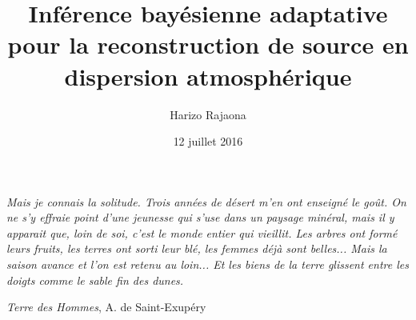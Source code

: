 \documentclass[oneside]{book}
\title{Inférence bayésienne adaptative pour la reconstruction de source en dispersion atmosphérique}
\date{12 juillet 2016}
\author{Harizo Rajaona}
\begin{document}
	\pagestyle{empty}
	
		\null
		\thispagestyle{empty}%
		\newpage

	\frontmatter
	\pagestyle{plain}

	
	\cleardoublepage

	
	\cleardoublepage

\setlength{\epigraphwidth}{0.8\textwidth}
\epigraph{\textit{\og Mais je connais la solitude. Trois années de désert m'en ont enseigné le goût. On ne s'y effraie point d'une jeunesse qui s'use dans un paysage minéral, mais il y apparait que, loin de soi, c'est le monde entier qui vieillit. Les arbres ont formé leurs fruits, les terres ont sorti leur blé, les femmes déjà sont belles... Mais la saison avance et l'on est retenu au loin... Et les biens de la terre glissent entre les doigts comme le sable fin des dunes. \fg{}}}{\textit{Terre des Hommes}, A. de Saint-Exupéry}
\cleardoublepage

	\renewcommand{\contentsname}{Sommaire} %
	\pagestyle{plain}
	\afterpage{\blankpage}

	\tableofcontents
	\cleardoublepage
	\pagestyle{plain}

	\listoffigures
	\cleardoublepage

	\pagestyle{fancy}

	
	
	
	
	
	

	
	
\end{document}
